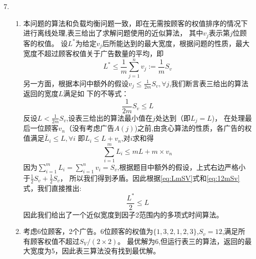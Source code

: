 \documentclass[a4paper]{article}
\begin{document}
\begin{enumerate}[label=\arabic*.]
    \setcounter{enumi}{6}
    \item 
    \begin{enumerate}[label=(\alph*)]
    \item
    本问题的算法和负载均衡问题一致，即在无需按顾客的权值排序的情况下进行离线处理,表三给出了求解问题使用的近似算法，
    其中$v_j$表示第$j$位顾客的权值。
    设$L^*$为给定$v_j$后所能达到的最大宽度，根据问题的性质，最大宽度不超过顾客权值关于广告数量的平均，即
    \begin{equation}\label{eq:LmSV}
        L^* \leq \frac{1}{m} \sum_{j=1}^n v_j:=\frac{1}{m} S_v
    \end{equation}
    另一方面，根据本问中额外的假设$v_j\leq \frac{1}{2m}S_v,\forall j$,我们断言表三给出的算法返回的宽度$L$满足如
    下的不等式：
    \begin{equation}\label{eq:12mSv}
        \frac{1}{2m} S_v \leq L
    \end{equation}
    反设$L<\frac{1}{2m} S_v$,设表三给出的算法最小值在$j$处达到（即$L_j=L$)，
    在处理最后一位顾客$v_n$（没有考虑广告$A(j)$)之前,由贪心算法的性质，各广告的权值满足$\tilde{L_i}\leq L,\forall i$
    即$L_i\leq L+v_n$,对$i$求和得
    \begin{equation}
        \sum_{i=1}^m L_i \leq mL+m\times v_n
    \end{equation}
    因为$\sum_{i=1}^m L_i=\sum_{i=1}^n v_i=S_v$,根据题目中额外的假设，上式右边严格小于$\frac{1}{2}S_v+\frac{1}{2}S_v$，
    所以我们得到矛盾。因此根据\eqref{eq:LmSV}式和\eqref{eq:12mSv}式，我们直接推出:
    \begin{equation}
        \frac{L^*}{2}\leq L
    \end{equation}
    因此我们给出了一个近似宽度到因子2范围内的多项式时间算法。
    
    \item
        考虑6位顾客，2个广告。6位顾客的权值为$\{1,3,2,1,2,3\}$,$S_v=12$,满足所有顾客权值不超过$S_V/(2\times 2)$。
        最优解为6,但运行表三的算法，返回的最大宽度为5，因此表三算法没有找到最优解。
    \end{enumerate}
    
     \end{enumerate}
\end{document}
